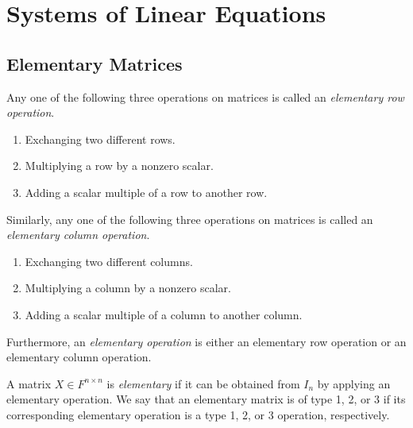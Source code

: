 \chapter{Systems of Linear Equations}
\section{Elementary Matrices}
\begin{definition}
  \label{def:elementary-operation}
  Any one of the following three operations on matrices is called an
  \emph{elementary row operation}.
  \begin{enumerate}[leftmargin=5em,label={(Type \arabic*)}]
    \item Exchanging two different rows.
    \item Multiplying a row by a nonzero scalar.
    \item Adding a scalar multiple of a row to another row.
  \end{enumerate}
  Similarly, any one of the following three operations on matrices is called an
  \emph{elementary column operation}.
  \begin{enumerate}[leftmargin=5em,label={(Type \arabic*)}]
    \item Exchanging two different columns.
    \item Multiplying a column by a nonzero scalar.
    \item Adding a scalar multiple of a column to another column.
  \end{enumerate}
  Furthermore, an \emph{elementary operation} is either an elementary row
  operation or an elementary column operation.
\end{definition}

\begin{definition}
  \label{def:elementary-matrix}
  A matrix $X \in F^{n \times n}$ is \emph{elementary} if it can be obtained
  from $I_n$ by applying an elementary operation.
  We say that an elementary matrix is of type 1, 2, or 3 if its corresponding
  elementary operation is a type 1, 2, or 3 operation, respectively.
\end{definition}

